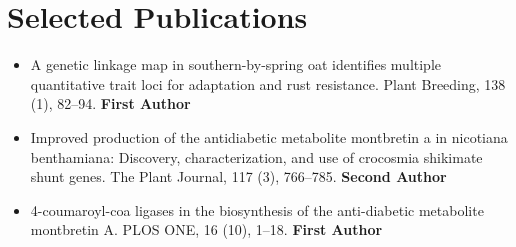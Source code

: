 \documentclass[letterpaper,11pt]{article}
\makeatletter
\newcommand{\customfullcite}[2][]{%
    \begingroup
    \@ifundefined{custommaxnames}{%
        \def\custommaxnames{1}%
    }{}%
    \ifblank{#1}{}{%
        \def\custommaxnames{#1}%
    }%
    \def\abx@field@labelnumber{\custommaxnames}%
    \fullcite{#2}%
    \endgroup
}
\makeatother
\begin{document}

\section*{Selected Publications}
\begin{itemize}[leftmargin=0.15in, label={}]
    \item{A genetic linkage map in southern-by-spring oat identifies multiple quantitative trait loci for adaptation and rust
    resistance. Plant Breeding, 138 (1), 82–94.       \textbf{First Author}}
    \item{Improved production of the antidiabetic metabolite montbretin a in nicotiana
    benthamiana: Discovery, characterization, and use of crocosmia shikimate shunt genes. The Plant Journal,
    117 (3), 766–785.        \textbf{Second Author}}
    \item{4-coumaroyl-coa ligases in the biosynthesis of the anti-diabetic metabolite montbretin A. PLOS ONE, 16 (10),
    1–18.        \textbf{First Author}}
\end{itemize}
\end{document}
